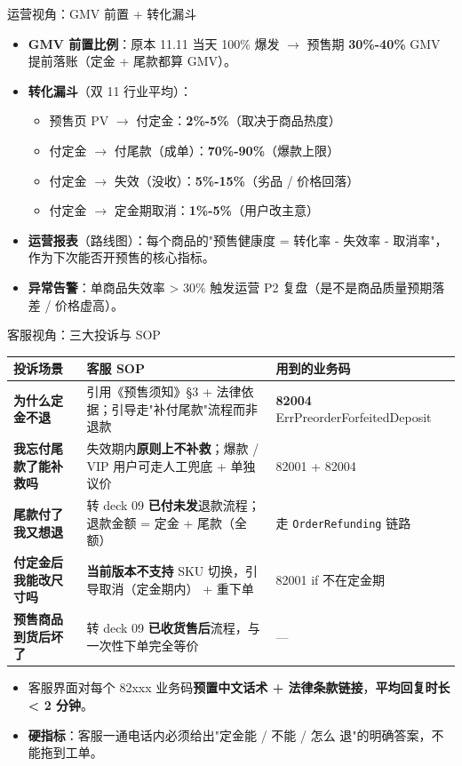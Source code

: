 \documentclass[aspectratio=169,11pt]{beamer}
\begin{document}
\begin{frame}[shrink]{运营视角：GMV 前置 + 转化漏斗}
\begin{itemize}\small
  \item \textbf{GMV 前置比例}：原本 11.11 当天 100\% 爆发 $\to$ 预售期 \textbf{30\%-40\%} GMV 提前落账（定金 + 尾款都算 GMV）。
  \item \textbf{转化漏斗}（双 11 行业平均）：
    \begin{itemize}\footnotesize
      \item 预售页 PV $\to$ 付定金：\textbf{2\%-5\%}（取决于商品热度）
      \item 付定金 $\to$ 付尾款（成单）：\textbf{70\%-90\%}（爆款上限）
      \item 付定金 $\to$ 失效（没收）：\textbf{5\%-15\%}（劣品 / 价格回落）
      \item 付定金 $\to$ 定金期取消：\textbf{1\%-5\%}（用户改主意）
    \end{itemize}
  \item \textbf{运营报表}（路线图）：每个商品的"预售健康度 = 转化率 - 失效率 - 取消率"，作为下次能否开预售的核心指标。
  \item \textbf{异常告警}：单商品失效率 > 30\% 触发运营 P2 复盘（是不是商品质量预期落差 / 价格虚高）。
\end{itemize}
\end{frame}

\begin{frame}[shrink]{客服视角：三大投诉与 SOP}
{\footnotesize
\begin{tabular}{@{}lp{5.5cm}p{4.5cm}@{}}
\toprule
投诉场景 & 客服 SOP & 用到的业务码 \\
\midrule
\textbf{为什么定金不退} & 引用《预售须知》§3 + 法律依据；引导走"补付尾款"流程而非退款 & \textbf{82004} ErrPreorderForfeitedDeposit \\
\textbf{我忘付尾款了能补救吗} & 失效期内\textbf{原则上不补救}；爆款 / VIP 用户可走人工兜底 + 单独议价 & 82001 + 82004 \\
\textbf{尾款付了我又想退} & 转 deck 09 \textbf{已付未发}退款流程；退款金额 = 定金 + 尾款（全额） & 走 \texttt{OrderRefunding} 链路 \\
\textbf{付定金后我能改尺寸吗} & \textbf{当前版本不支持} SKU 切换，引导取消（定金期内） + 重下单 & 82001 if 不在定金期 \\
\textbf{预售商品到货后坏了} & 转 deck 09 \textbf{已收货售后}流程，与一次性下单完全等价 & — \\
\bottomrule
\end{tabular}}
\vspace{2mm}
\begin{itemize}\small
  \item 客服界面对每个 82xxx 业务码\textbf{预置中文话术 + 法律条款链接}，\textbf{平均回复时长 < 2 分钟}。
  \item \textbf{硬指标}：客服一通电话内必须给出"定金能 / 不能 / 怎么 退"的明确答案，不能拖到工单。
\end{itemize}
\end{frame}
\end{document}
